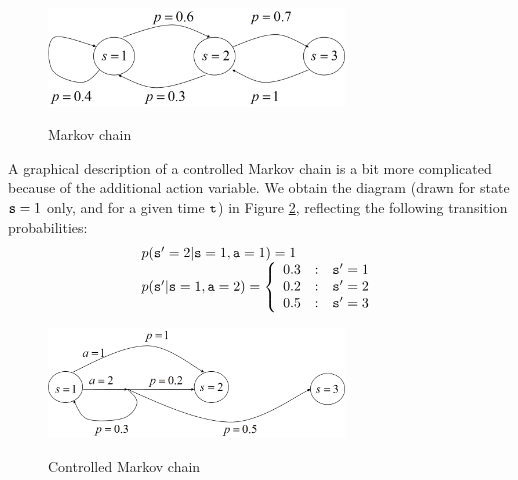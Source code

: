 \begin{figure}
  \begin{centering}
  \includegraphics[width=0.7\textwidth]{figures/lecture4_a}\\
  \caption{Markov chain}\label{fig:MC}
  \end{centering}
\end{figure}

A graphical description of a controlled Markov chain is a bit more
complicated because of the additional action variable. We obtain the
diagram (drawn for state ${\tt s} = 1$ only, and for a given time
${\tt t}$) in Figure \ref{fig:MDP}, reflecting the following
transition probabilities:
\[\begin{array}{l}
p(\state' = 2|\state = 1,\action = 1) = 1\\
p(\state'|\state = 1,\action = 2) = \left\{ {\begin{array}{*{20}{c}}
{0.3}&:&{\state' = 1}\\
{0.2}&:&{\state' = 2}\\
{0.5}&:&{\state' = 3}
\end{array}} \right.
\end{array}\]

\begin{figure}
  \begin{centering}
  \includegraphics[width=0.7\textwidth]{figures/lecture4_b}\\
  \caption{Controlled Markov chain}\label{fig:MDP}
  \end{centering}
\end{figure}



